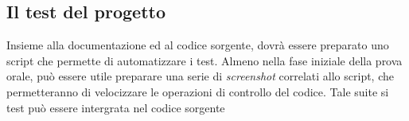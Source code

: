 \subsection{Il test del progetto}

Insieme alla documentazione ed al codice sorgente, dovrà essere preparato uno
script che permette di automatizzare i test. Almeno nella fase iniziale della
prova orale, può essere utile preparare una serie di \textit{screenshot}
correlati allo script, che permetteranno di velocizzare le operazioni di
controllo del codice. Tale suite si test può essere intergrata nel codice
sorgente
